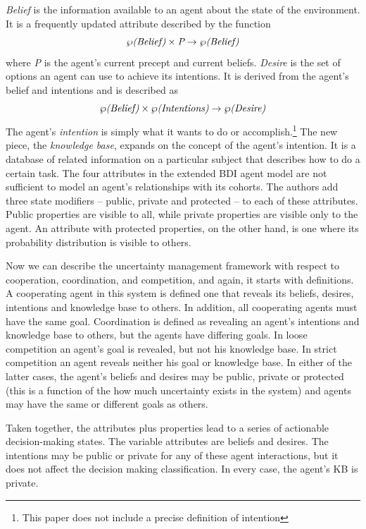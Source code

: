 \documentclass[11pt,letterpaper,onecolumn,twoside,openright,final]{report}
\begin{document}
\emph{Belief} is the information available to an agent about the state of the environment.
It is a frequently updated attribute described by the function \[\wp\emph{(Belief)}\times \emph{P}\to\wp\emph{(Belief)}\] where \emph{P} is the agent's current precept and current beliefs.
\emph{Desire} is the set of options an agent can use to achieve its intentions.
It is derived from the agent's belief and intentions and is described as \[\wp\emph{(Belief)}\times \wp\emph{(Intentions)}\to\wp\emph{(Desire)}\]
The agent's \emph{intention} is simply what it wants to do or accomplish.\footnote{This paper does not include a precise definition of intention}
The new piece, the \emph{knowledge base}, expands on the concept of the agent's intention.
It is a database of related information on a particular subject that describes how to do a certain task.
The four attributes in the extended BDI agent model are not sufficient to model an agent's relationships with its cohorts.
The authors add three state modifiers -- public, private and protected -- to each of these attributes.
Public properties are visible to all, while private properties are visible only to the agent.
An attribute with protected properties, on the other hand, is one where its probability distribution is visible to others.

Now we can describe the uncertainty management framework with respect to cooperation, coordination, and competition, and again, it starts with definitions.
A cooperating agent in this system is defined one that reveals its beliefs, desires, intentions and knowledge base to others.
In addition, all cooperating agents must have the same goal.
Coordination is defined as revealing an agent's intentions and knowledge base to others, but the agents have differing goals.
In loose competition an agent's goal is revealed, but not his knowledge base.
In strict competition an agent reveals neither his goal or knowledge base.
In either of the latter cases, the agent's beliefs and desires may be public, private or protected (this is a function of the how much uncertainty exists in the system) and agents may have the same or different goals as others.

Taken together, the attributes plus properties lead to a series of actionable decision-making states.
The variable attributes are beliefs and desires.
The intentions may be public or private for any of these agent interactions, but it does not affect the decision making classification.
In every case, the agent's KB is private.
\end{document}

